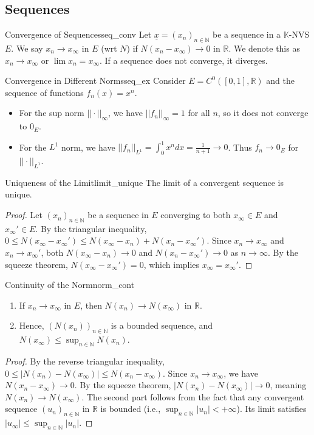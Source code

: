 \documentclass[11pt, a4paper]{article}
\newcommand{\R}{\mathbb{R}}
\newcommand{\N}{\mathbb{N}}
\begin{document}
\subsection{Sequences}
\begin{definition}{Convergence of Sequences}{seq_conv}
Let $\underline{x} = (x_n)_{n \in \mathbb{N}}$ be a sequence in a $\mathbb{K}$-NVS $E$.
We say $x_n \to x_\infty$ in $E$ (wrt $N$) if $N(x_n - x_\infty) \to 0$ in $\mathbb{R}$.
We denote this as $x_n \to x_\infty$ or $\lim x_n = x_\infty$. If a sequence does not converge, it diverges.
\end{definition}

\begin{example}{Convergence in Different Norms}{seq_ex}
Consider $E = C^0([0,1], \mathbb{R})$ and the sequence of functions $f_n(x) = x^n$.
\begin{itemize}
    \item For the sup norm $||\cdot||_\infty$, we have $||f_n||_\infty = 1$ for all $n$, so it does not converge to $0_E$.
    \item For the $L^1$ norm, we have $||f_n||_{L^1} = \int_0^1 x^n dx = \frac{1}{n+1} \to 0$. Thus $f_n \to 0_E$ for $||\cdot||_{L^1}$.
\end{itemize}
\end{example}

\begin{proposition}{Uniqueness of the Limit}{limit_unique}
The limit of a convergent sequence is unique.
\end{proposition}
\begin{proof}
Let $(x_n)_{n \in \N}$ be a sequence in $E$ converging to both $x_\infty \in E$ and $x_\infty' \in E$.
By the triangular inequality, $0 \le N(x_\infty - x_\infty') \le N(x_\infty - x_n) + N(x_n - x_\infty')$.
Since $x_n \to x_\infty$ and $x_n \to x_\infty'$, both $N(x_\infty - x_n) \to 0$ and $N(x_n - x_\infty') \to 0$ as $n \to \infty$. By the squeeze theorem, $N(x_\infty - x_\infty') = 0$, which implies $x_\infty = x_\infty'$.
\end{proof}

\begin{proposition}{Continuity of the Norm}{norm_cont}
\begin{enumerate}
    \item If $x_n \to x_\infty$ in $E$, then $N(x_n) \to N(x_\infty)$ in $\R$.
    \item Hence, $(N(x_n))_{n \in \N}$ is a bounded sequence, and $N(x_\infty) \le \sup_{n \in \N} N(x_n)$.
\end{enumerate}
\end{proposition}
\begin{proof}
By the reverse triangular inequality, $0 \le |N(x_n) - N(x_\infty)| \le N(x_n - x_\infty)$.
Since $x_n \to x_\infty$, we have $N(x_n - x_\infty) \to 0$. By the squeeze theorem, $|N(x_n) - N(x_\infty)| \to 0$, meaning $N(x_n) \to N(x_\infty)$.
The second part follows from the fact that any convergent sequence $(u_n)_{n \in \N}$ in $\R$ is bounded (i.e., $\sup_{n \in \N} |u_n| < +\infty$). Its limit satisfies $|u_\infty| \le \sup_{n \in \N} |u_n|$.
\end{proof}
\end{document}
